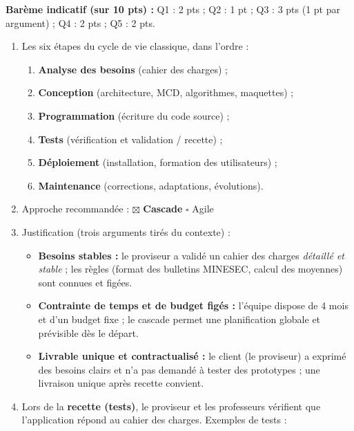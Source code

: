 \documentclass[11pt]{article}
\begin{document}
\begin{corrige}
\textbf{Barème indicatif (sur 10 pts) :} Q1 : 2 pts ; Q2 : 1 pt ; Q3 : 3 pts (1 pt par argument) ; Q4 : 2 pts ; Q5 : 2 pts.

\begin{enumerate}
    \item Les six étapes du cycle de vie classique, dans l'ordre :
    \begin{enumerate}
        \item \textbf{Analyse des besoins} (cahier des charges) ;
        \item \textbf{Conception} (architecture, MCD, algorithmes, maquettes) ;
        \item \textbf{Programmation} (écriture du code source) ;
        \item \textbf{Tests} (vérification et validation / recette) ;
        \item \textbf{Déploiement} (installation, formation des utilisateurs) ;
        \item \textbf{Maintenance} (corrections, adaptations, évolutions).
    \end{enumerate}
    \item Approche recommandée : \hspace{0.5cm} $\boxtimes$ \textbf{Cascade} \quad $\square$ Agile
    \item Justification (trois arguments tirés du contexte) :
    \begin{itemize}
        \item \textbf{Besoins stables :} le proviseur a validé un cahier des charges \emph{détaillé et stable} ; les règles (format des bulletins MINESEC, calcul des moyennes) sont connues et figées.
        \item \textbf{Contrainte de temps et de budget figés :} l'équipe dispose de 4 mois et d'un budget fixe ; le cascade permet une planification globale et prévisible dès le départ.
        \item \textbf{Livrable unique et contractualisé :} le client (le proviseur) a exprimé des besoins clairs et n'a pas demandé à tester des prototypes ; une livraison unique après recette convient.
    \end{itemize}
    \item Lors de la \textbf{recette (tests)}, le proviseur et les professeurs vérifient que l'application répond au cahier des charges. Exemples de tests :
    \begin{itemize}

\end{itemize}
\end{enumerate}
\end{corrige}
\end{document}
